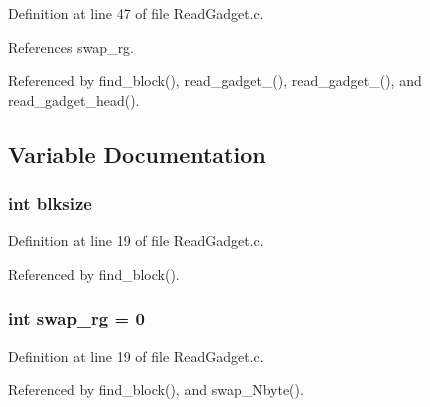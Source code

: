Definition at line 47 of file ReadGadget.c.



References swap\_\-rg.



Referenced by find\_\-block(), read\_\-gadget\_(), read\_\-gadget\_(), and read\_\-gadget\_\-head().



\subsection{Variable Documentation}
\subsubsection[{blksize}]{\setlength{\rightskip}{0pt plus 5cm}int {\bf blksize}}\label{ReadGadget_8c_a5db008489406de834c7b5598d3b90f40}


Definition at line 19 of file ReadGadget.c.



Referenced by find\_\-block().

\subsubsection[{swap\_\-rg}]{\setlength{\rightskip}{0pt plus 5cm}int {\bf swap\_\-rg} = 0}\label{ReadGadget_8c_ae70144953948473460e0504c93802402}


Definition at line 19 of file ReadGadget.c.



Referenced by find\_\-block(), and swap\_\-Nbyte().

